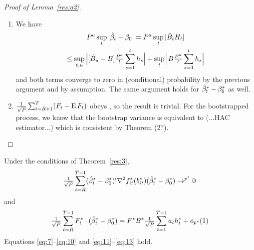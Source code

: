 \documentclass[12pt,fleqn]{article}
\begin{document}
\begin{proof}[Proof of Lemma~\ref{res:a2}]
\begin{enumerate}
    Since
    \[
    \omax{t} \Big|\sum_{s=K_{j^*_t - 1}+1}^t h_s^*/t \Big| \leq \sum_{i=1}^{J} \max_{t = K_{i-1}+1,\dots,K_i} \Big| \sum_{s=K_{i-1}+1}^t h_s^*/t \Big|
    \]
    the proof that the second component converges to zero is similar.
  \item We have
    \begin{multline}
      P^a \sup_t | \hat{\beta}_t - \beta_0 | = P^a \sup_t |\hat{B}_{t}
      H_{t}| \\ \leq \sup_{t,u} \Big| [ \hat{B}_u - B]
      \tfrac{P^a}{t} \sum_{s=1}^t h_{s} \Big| + \sup_{t} \Big|
      B \tfrac{P^a}{t} \sum_{s=1}^t h_{s} \Big|
    \end{multline}
    and both terms converge to zero in (conditional) probability by
    the previous argument and by assumption.  The same argument holds
    for $\hat{\beta}_t^{*} - \beta_0^*$ as well.
  \item $\tfrac{1}{\sqrt{P}} \sum_{t=R+1}^T (F_t - \operatorname{E} F_t)$ obeys
     \clt, so the result is trivial. For the
    bootstrapped process, we know that the bootstrap variance is
    equivalent to (...HAC estimator...) which is consistent by
     Theorem (2?).\qedhere
  \end{enumerate}
\end{proof}

\begin{lema}\label{res:a4}
  Under the conditions of Theorem~\ref{res:3},
  \begin{equation}\label{eq:16}
    \tfrac{1}{\sqrt{P}} \sum_{t=R}^{T-1} (\hat \beta_t^* - \beta_0^*)' \nabla^2 f_{it}^*(b_{it}^*) (\hat \beta_t^* - \beta_0^*) \to^{p^*} 0
  \end{equation}
  and
  \begin{equation}\label{eq:17}
    \tfrac{1}{\sqrt{P}} \sum_{t=R}^{T-1} F_t^* \cdot (\hat \beta_t^* - \beta_0^*)
    = F^* B^* \tfrac{1}{\sqrt{P}} \sum_{t=1}^{T-1} a_t h_t^* + o_{p^*}(1)
  \end{equation}
Equations
  \eqref{eq:7}--\eqref{eq:10} and \eqref{eq:11}--\eqref{eq:13} hold.
\end{lema}
\end{document}
